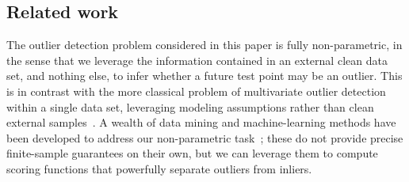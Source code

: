 

\subsection{Related work}

The outlier detection problem considered in this paper is fully non-parametric, in the sense that we leverage the information contained in an external clean data set, and nothing else, to infer whether a future test point may be an outlier.
This is in contrast with the more classical problem of multivariate outlier detection within a single data set, leveraging modeling assumptions rather than clean external samples~\cite{wilks1963multivariate,hawkins1980identification,riani2009finding,cerioli2010multivariate}.
A wealth of data mining and machine-learning methods have been developed to address our non-parametric task~\cite{khan2014one,agrawal2015survey,aggarwal2015outlier,sabokrou2018adversarially,chalapathy2019deep}; these do not provide precise finite-sample guarantees on their own, but we can leverage them to compute scoring functions that powerfully separate outliers from inliers.

